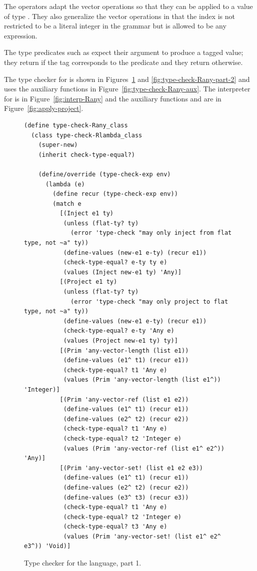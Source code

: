 \documentclass[7x10]{TimesAPriori_MIT}%
\begin{document}
The  operators adapt the vector operations so that
they can be applied to a value of type .  They also
generalize the vector operations in that the index is not restricted
to be a literal integer in the grammar but is allowed to be any
expression.

The type predicates such as  expect their argument to
produce a tagged value; they return  if the tag corresponds
to the predicate and they return  otherwise.

The type checker for \LangAny{} is shown in
Figures~\ref{fig:type-check-Rany-part-1} and
\ref{fig:type-check-Rany-part-2} and uses the auxiliary functions in
Figure~\ref{fig:type-check-Rany-aux}.
%
The interpreter for \LangAny{} is in Figure~\ref{fig:interp-Rany} and the
auxiliary functions  and  are
in Figure~\ref{fig:apply-project}.


\begin{figure}[btp]
 \begin{lstlisting}[basicstyle=\ttfamily\small]
(define type-check-Rany_class
  (class type-check-Rlambda_class
    (super-new)
    (inherit check-type-equal?)

    (define/override (type-check-exp env)
      (lambda (e)
        (define recur (type-check-exp env))
        (match e
          [(Inject e1 ty)
           (unless (flat-ty? ty)
             (error 'type-check "may only inject from flat type, not ~a" ty))
           (define-values (new-e1 e-ty) (recur e1))
           (check-type-equal? e-ty ty e)
           (values (Inject new-e1 ty) 'Any)]
          [(Project e1 ty)
           (unless (flat-ty? ty)
             (error 'type-check "may only project to flat type, not ~a" ty))
           (define-values (new-e1 e-ty) (recur e1))
           (check-type-equal? e-ty 'Any e)
           (values (Project new-e1 ty) ty)]
          [(Prim 'any-vector-length (list e1))
           (define-values (e1^ t1) (recur e1))
           (check-type-equal? t1 'Any e)
           (values (Prim 'any-vector-length (list e1^)) 'Integer)]
          [(Prim 'any-vector-ref (list e1 e2))
           (define-values (e1^ t1) (recur e1))
           (define-values (e2^ t2) (recur e2))
           (check-type-equal? t1 'Any e)
           (check-type-equal? t2 'Integer e)
           (values (Prim 'any-vector-ref (list e1^ e2^)) 'Any)]
          [(Prim 'any-vector-set! (list e1 e2 e3))
           (define-values (e1^ t1) (recur e1))
           (define-values (e2^ t2) (recur e2))
           (define-values (e3^ t3) (recur e3))
           (check-type-equal? t1 'Any e)
           (check-type-equal? t2 'Integer e)
           (check-type-equal? t3 'Any e)
           (values (Prim 'any-vector-set! (list e1^ e2^ e3^)) 'Void)]
\end{lstlisting}
\caption{Type checker for the \LangAny{} language, part 1.}
\label{fig:type-check-Rany-part-1}
\end{figure}
\end{document}
